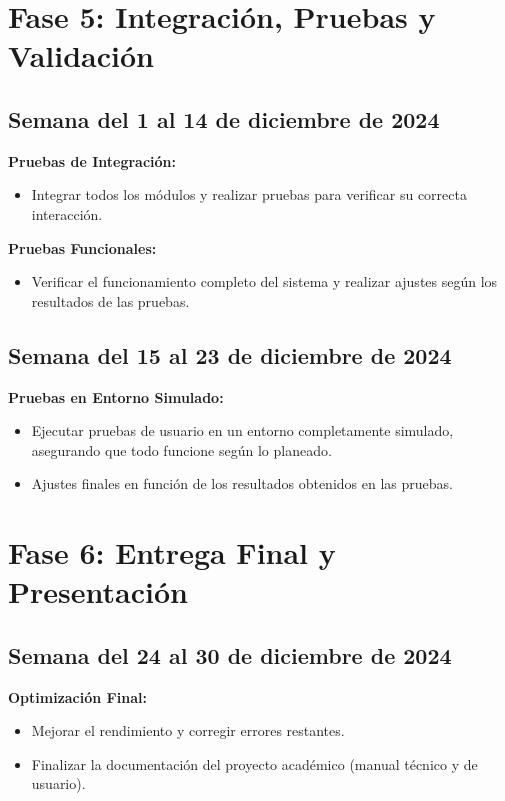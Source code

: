 \documentclass{report}
\begin{document}
    \section*{Fase 5: Integración, Pruebas y Validación}
    \subsection*{Semana del 1 al 14 de diciembre de 2024}
    \textbf{Pruebas de Integración:}
    \begin{itemize}
        \item Integrar todos los módulos y realizar pruebas para verificar su correcta interacción.
    \end{itemize}
    \textbf{Pruebas Funcionales:}
    \begin{itemize}
        \item Verificar el funcionamiento completo del sistema y realizar ajustes según los resultados de las pruebas.
    \end{itemize}

    \subsection*{Semana del 15 al 23 de diciembre de 2024}
    \textbf{Pruebas en Entorno Simulado:}
    \begin{itemize}
        \item Ejecutar pruebas de usuario en un entorno completamente simulado, asegurando que todo funcione según lo planeado.
        \item Ajustes finales en función de los resultados obtenidos en las pruebas.
    \end{itemize}

    \section*{Fase 6: Entrega Final y Presentación}
    \subsection*{Semana del 24 al 30 de diciembre de 2024}
    \textbf{Optimización Final:}
    \begin{itemize}
        \item Mejorar el rendimiento y corregir errores restantes.
        \item Finalizar la documentación del proyecto académico (manual técnico y de usuario).
    \end{itemize}
\end{document}
